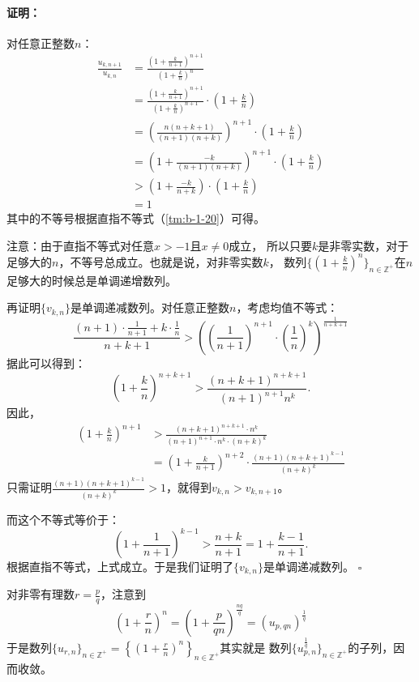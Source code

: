 \documentclass[12pt,UTF8]{ctexbook}
\theoremstyle{definition}
\theoremstyle{plain}
\renewenvironment{proof}{\paragraph{\textbf{证明：}}}{\hfill$\square$}
\begin{document}
\begin{appendix}
\begin{proof}
    对任意正整数$n$：
    \begin{align*}
        \frac{u_{k,n+1}}{u_{k,n}} &= \frac{\left(1 + \frac{k}{n+1}\right)^{n+1}}{\left(1 + \frac{k}{n}\right)^n}  \\
        &= \frac{\left(1 + \frac{k}{n+1}\right)^{n+1}}{\left(1 + \frac{k}{n}\right)^{n+1}} \cdot \left(1 + \frac{k}{n}\right)  \\
        &= \left(\frac{n(n+k+1)}{(n+1)(n+k)}\right)^{n+1} \cdot \left(1 + \frac{k}{n}\right)  \\
        &= \left(1 + \frac{-k}{(n+1)(n+k)}\right)^{n+1} \cdot \left(1 + \frac{k}{n}\right)  \\
        &> \left(1 + \frac{-k}{n+k}\right)\cdot \left(1 + \frac{k}{n}\right)  \\
        &= 1  
    \end{align*}
    其中的不等号根据直指不等式（\ref{tm:b-1-20}）可得。
    
    注意：由于直指不等式对任意$x>-1$且$x\neq 0$成立，
    所以只要$k$是非零实数，对于足够大的$n$，不等号总成立。也就是说，对非零实数$k$，
    数列$\{\left(1 + \frac{k}{n}\right)^n\}_{n\in\mathbb{Z}^+}$在$n$足够大的时候总是单调递增数列。

    再证明$\{v_{k,n}\}$是单调递减数列。对任意正整数$n$，考虑均值不等式：
    $$ \frac{(n+1)\cdot \frac{1}{n+1} + k\cdot \frac{1}{n}}{n+k+1} > \left(\left(\frac{1}{n+1}\right)^{n+1} \cdot \left(\frac{1}{n}\right)^{k}\right)^{\frac{1}{n+k+1}} $$
    据此可以得到：
    $$ \left(1 + \frac{k}{n}\right)^{n+k+1} > \frac{(n+k+1)^{n+k+1}}{(n+1)^{n+1} n^k}. $$
    因此，
    \begin{align*}
        \left(1 + \frac{k}{n}\right)^{n+1} &> \frac{(n+k+1)^{n+k+1}\cdot n^k}{(n+1)^{n+1}\cdot n^k\cdot (n+k)^k}  \\
        &= \left(1 + \frac{k}{n+1}\right)^{n+2} \cdot \frac{(n+1)(n+k+1)^{k-1}}{(n+k)^k} 
    \end{align*}
    只需证明$\frac{(n+1)(n+k+1)^{k-1}}{(n+k)^k} > 1$，就得到$v_{k,n} > v_{k,n+1}$。
    
    而这个不等式等价于：
    $$ \left(1 + \frac{1}{n+1}\right)^{k-1} > \frac{n+k}{n+1} = 1 + \frac{k-1}{n+1}.$$
    根据直指不等式，上式成立。于是我们证明了$\{v_{k,n}\}$是单调递减数列。
\end{proof}

对非零有理数$r = \frac{p}{q}$，注意到
$$ \left(1 + \frac{r}{n}\right)^n = \left(1 + \frac{p}{qn}\right)^{\frac{nq}{q}} = \left(u_{p,qn}\right)^\frac{1}{q}$$
于是数列$\displaystyle\{u_{r,n}\}_{n\in\mathbb{Z}^+} = \left\{\left(1 + \frac{r}{n}\right)^n\right\}_{n\in\mathbb{Z}^+}$其实就是
数列$\{u_{p,n}^{\frac{1}{q}}\}_{n\in\mathbb{Z}^+}$的子列，因而收敛。


\end{appendix}
\end{document}
